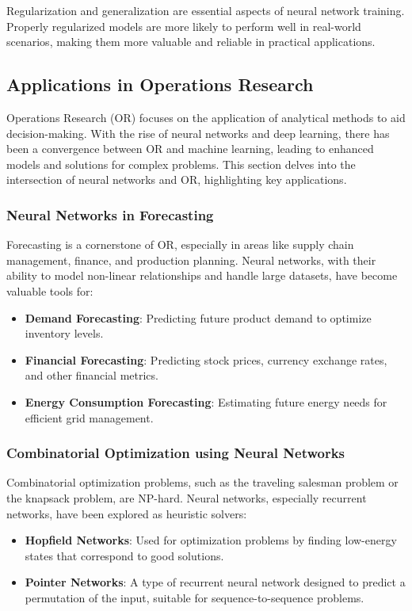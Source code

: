 Regularization and generalization are essential aspects of neural network training. Properly regularized models are more likely to perform well in real-world scenarios, making them more valuable and reliable in practical applications.

\subsection{Applications in Operations Research}

Operations Research (OR) focuses on the application of analytical methods to aid decision-making. With the rise of neural networks and deep learning, there has been a convergence between OR and machine learning, leading to enhanced models and solutions for complex problems. This section delves into the intersection of neural networks and OR, highlighting key applications.

\subsubsection{Neural Networks in Forecasting}

Forecasting is a cornerstone of OR, especially in areas like supply chain management, finance, and production planning. Neural networks, with their ability to model non-linear relationships and handle large datasets, have become valuable tools for:

\begin{itemize}
    \item \textbf{Demand Forecasting}: Predicting future product demand to optimize inventory levels.
    \item \textbf{Financial Forecasting}: Predicting stock prices, currency exchange rates, and other financial metrics.
    \item \textbf{Energy Consumption Forecasting}: Estimating future energy needs for efficient grid management.
\end{itemize}

\subsubsection{Combinatorial Optimization using Neural Networks}

Combinatorial optimization problems, such as the traveling salesman problem or the knapsack problem, are NP-hard. Neural networks, especially recurrent networks, have been explored as heuristic solvers:

\begin{itemize}
    \item \textbf{Hopfield Networks}: Used for optimization problems by finding low-energy states that correspond to good solutions.
    \item \textbf{Pointer Networks}: A type of recurrent neural network designed to predict a permutation of the input, suitable for sequence-to-sequence problems.
\end{itemize}

